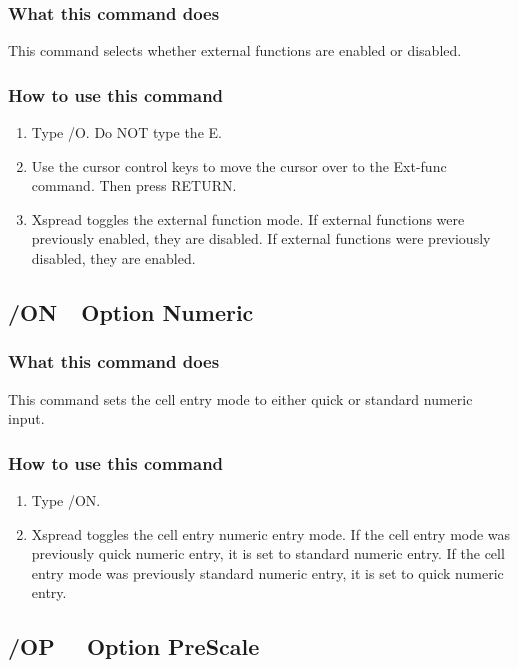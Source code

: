 \subsubsection*{What this command does}
This command selects whether external functions are enabled or 
disabled.

\subsubsection*{How to use this command}
\begin{enumerate}
\item{Type /O.  Do NOT type the E.}
\item{Use the cursor control keys to move the cursor over to the
        Ext-func command.  Then press RETURN.}
\item{Xspread toggles the external function mode.  If external functions
        were previously enabled, they are disabled.  If external functions
        were previously disabled, they are enabled.}
\end{enumerate}
        
\subsection*{/ON\ \      Option Numeric}

\subsubsection*{What this command does}
This command sets the cell entry mode to either quick or standard 
numeric input.

\subsubsection*{How to use this command}
\begin{enumerate}
\item{Type /ON.}
\item{Xspread toggles the cell entry numeric entry mode.  If the cell
        entry mode was previously quick numeric entry, it is set to
        standard numeric entry.  If the cell entry mode was previously
        standard numeric entry, it is set to quick numeric entry.}
\end{enumerate}
        
\subsection*{/OP \ \     Option PreScale}

